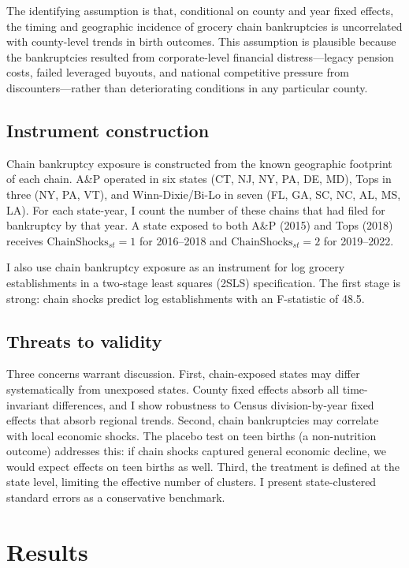 \documentclass[12pt]{article}
\begin{document}
The identifying assumption is that, conditional on county and year fixed effects, the timing and geographic incidence of grocery chain bankruptcies is uncorrelated with county-level trends in birth outcomes. This assumption is plausible because the bankruptcies resulted from corporate-level financial distress---legacy pension costs, failed leveraged buyouts, and national competitive pressure from discounters---rather than deteriorating conditions in any particular county.

\subsection{Instrument construction}

Chain bankruptcy exposure is constructed from the known geographic footprint of each chain. A\&P operated in six states (CT, NJ, NY, PA, DE, MD), Tops in three (NY, PA, VT), and Winn-Dixie/Bi-Lo in seven (FL, GA, SC, NC, AL, MS, LA). For each state-year, I count the number of these chains that had filed for bankruptcy by that year. A state exposed to both A\&P (2015) and Tops (2018) receives $\text{ChainShocks}_{st} = 1$ for 2016--2018 and $\text{ChainShocks}_{st} = 2$ for 2019--2022.

I also use chain bankruptcy exposure as an instrument for log grocery establishments in a two-stage least squares (2SLS) specification. The first stage is strong: chain shocks predict log establishments with an F-statistic of 48.5.

\subsection{Threats to validity}

Three concerns warrant discussion. First, chain-exposed states may differ systematically from unexposed states. County fixed effects absorb all time-invariant differences, and I show robustness to Census division-by-year fixed effects that absorb regional trends. Second, chain bankruptcies may correlate with local economic shocks. The placebo test on teen births (a non-nutrition outcome) addresses this: if chain shocks captured general economic decline, we would expect effects on teen births as well. Third, the treatment is defined at the state level, limiting the effective number of clusters. I present state-clustered standard errors as a conservative benchmark.

\section{Results}
\end{document}
